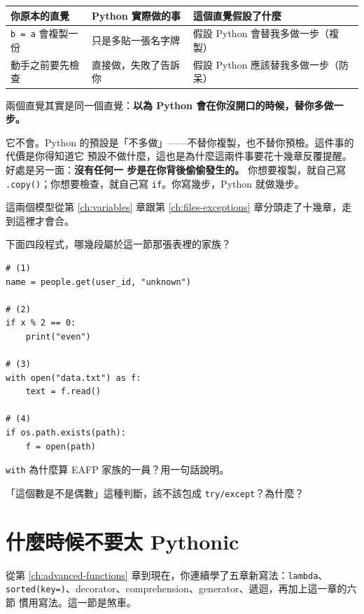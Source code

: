 \begin{center}
\begin{tabular}{@{}p{3.8cm}p{4.4cm}p{6.2cm}@{}}
\toprule
你原本的直覺 & Python 實際做的事 & 這個直覺假設了什麼 \\
\midrule
\texttt{b = a} 會複製一份 &
只是多貼一張名字牌 &
假設 Python 會替我多做一步（複製） \\
\addlinespace
動手之前要先檢查 &
直接做，失敗了告訴你 &
假設 Python 應該替我多做一步（防呆） \\
\bottomrule
\end{tabular}
\end{center}

兩個直覺其實是同一個直覺：\textbf{以為 Python 會在你沒開口的時候，替你多做一步。}

它不會。Python 的預設是「不多做」——不替你複製，也不替你預檢。這件事的代價是你得知道它
預設不做什麼，這也是為什麼這兩件事要花十幾章反覆提醒。好處是另一面：\textbf{沒有任何一
步是在你背後偷偷發生的。} 你想要複製，就自己寫 \texttt{.copy()}；你想要檢查，就自己寫
\texttt{if}。你寫幾步，Python 就做幾步。

這兩個模型從第 \ref{ch:variables} 章跟第 \ref{ch:files-exceptions} 章分頭走了十幾章，走
到這裡才會合。

\begin{drills}[label=drills:eafp-closure]
\item 下面四段程式，哪幾段屬於這一節那張表裡的家族？
\begin{verbatim}
# (1)
name = people.get(user_id, "unknown")

# (2)
if x % 2 == 0:
    print("even")

# (3)
with open("data.txt") as f:
    text = f.read()

# (4)
if os.path.exists(path):
    f = open(path)
\end{verbatim}
\item \texttt{with} 為什麼算 EAFP 家族的一員？用一句話說明。
\item 「這個數是不是偶數」這種判斷，該不該包成 \texttt{try/except}？為什麼？
\end{drills}

\section{什麼時候不要太 Pythonic}
\label{sec:not-too-pythonic}

從第 \ref{ch:advanced-functions} 章到現在，你連續學了五章新寫法：\texttt{lambda}、
\texttt{sorted(key=)}、decorator、comprehension、generator、遞迴，再加上這一章的六節
慣用寫法。這一節是煞車。

